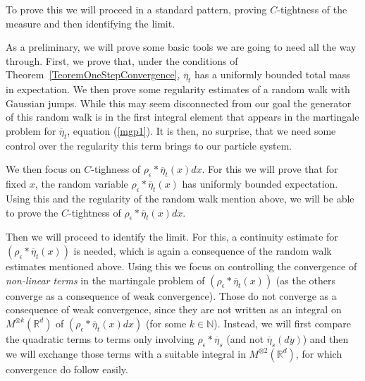 \documentclass[12pt]{article}
\begin{document}




To prove this we will proceed in a standard pattern, proving $C$-tightness of the measure and then identifying the limit.

As a preliminary, we will prove some basic tools we are going to need all the way through. First, we prove that, under the conditions of Theorem~\ref{TeoremOneStepConvergence}, $\overline{\eta}_t$ has a uniformly bounded total mass in expectation. We then prove some regularity estimates of a random walk with Gaussian jumps. While this may seem disconnected from our goal the generator of this random walk is in the first integral element that appears in the martingale problem for $\overline{\eta}_t$, equation (\ref{mgp1}). It is then, no surprise, that we need some control over the regularity this term brings to our particle system.

We then focus on $C$-tighness of $\rho_\epsilon * \overline{\eta}_t(x)dx$. For this we will prove that for fixed $x$, the random variable $\rho_\epsilon*\overline{\eta}_t(x)$ has uniformly bounded expectation. Using this and the regularity of the random walk mention above, we will be able to prove the $C$-tightness of $\rho_\epsilon * \overline{\eta}_t(x)dx$.

Then we will proceed to identify the limit. For this, a continuity estimate for $(\rho_\epsilon*\overline{\eta}_t(x))$ is needed, which is again a consequence of the random walk estimates mentioned above. Using this we focus on controlling the convergence of \textit{non-linear terms} in the martingale problem of $(\rho_\epsilon*\overline{\eta}_t(x))$ (as the others converge as a consequence of weak convergence). Those do not converge as a consequence of weak convergence, since they are not written as an integral on $M^{\otimes k}(\mathbb{R}^d)$ of $(\rho_\epsilon*\overline{\eta}_t(x) dx)$ (for some $k \in \mathbb{N}$). Instead, we will first compare the quadratic terms to terms only involving $\rho_\epsilon*\overline{\eta}_s$ (and not $\overline{\eta}_s(dy)$) and then we will exchange those terms with a suitable integral in $M^{\otimes2}(\mathbb{R}^d)$, for which convergence do follow easily.
\end{document}
